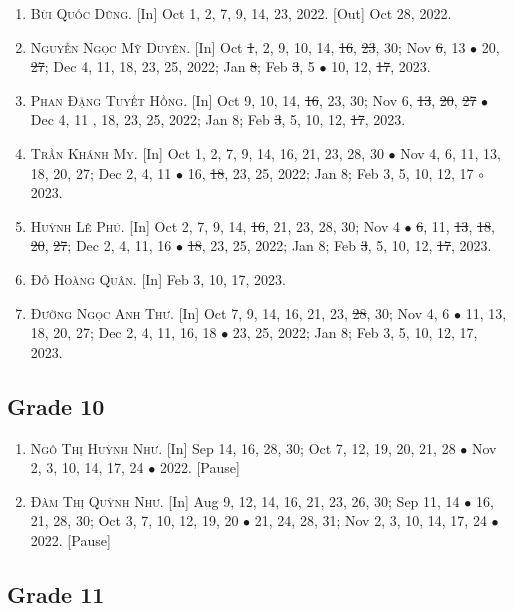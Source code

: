 \documentclass{article}
\numberwithin{equation}{section}
\begin{document}
\begin{enumerate}
	\item \textsc{Bùi Quốc Dũng.} \textsf{[In]} Oct 1, 2, 7, 9, 14, 23, 2022. \textsf{[Out]} Oct 28, 2022.
	\item \textsc{Nguyễn Ngọc Mỹ Duyên.} \textsf{[In]} Oct \st{1}, 2, 9, 10, 14, \st{16}, \st{23}, 30; Nov \st{6}, 13 $\bullet$ 20, \st{27}; Dec 4, 11, 18, 23, 25, 2022; Jan \st{8}; Feb \st{3}, 5 $\bullet$ 10, 12, \st{17}, 2023.
	\item \textsc{Phan Đặng Tuyết Hồng.} \textsf{[In]} Oct 9, 10, 14, \st{16}, 23, 30; Nov 6, \st{13}, \st{20}, \st{27} $\bullet$ Dec 4, 11 , 18, 23, 25, 2022; Jan 8; Feb \st{3}, 5, 10, 12, \st{17}, 2023.
	\item \textsc{Trần Khánh My.} \textsf{[In]} Oct 1, 2, 7, 9, 14, 16, 21, 23, 28, 30 $\bullet$ Nov 4, 6, 11, 13, 18, 20, 27; Dec 2, 4, 11 $\bullet$ 16, \st{18}, 23, 25, 2022; Jan 8; Feb 3, 5, 10, 12, 17 $\circ$ 2023.
	\item \textsc{Huỳnh Lê Phú.} \textsf{[In]} Oct 2, 7, 9, 14, \st{16}, 21, 23, 28, 30; Nov 4 $\bullet$ \st{6}, 11, \st{13}, \st{18}, \st{20}, \st{27}; Dec 2, 4, 11, 16 $\bullet$ \st{18}, 23, 25, 2022; Jan 8; Feb \st{3}, 5, 10, 12, \st{17}, 2023.
	\item \textsc{Đỗ Hoàng Quân.} \textsf{[In]} Feb 3, 10, 17, 2023.
	\item \textsc{Đường Ngọc Anh Thư.} \textsf{[In]} Oct 7, 9, 14, 16, 21, 23, \st{28}, 30; Nov 4, 6 $\bullet$ 11, 13, 18, 20, 27; Dec 2, 4, 11, 16, 18 $\bullet$ 23, 25, 2022; Jan 8; Feb 3, 5, 10, 12, 17, 2023.
\end{enumerate}

\subsection{Grade 10}

\begin{enumerate}
	\item \textsc{Ngô Thị Huỳnh Như.} \textsf{[In]} Sep 14, 16, 28, 30; Oct 7, 12, 19, 20, 21, 28 $\bullet$ Nov 2, 3, 10, 14, 17, 24 $\bullet$ 2022. \textsf{[Pause]}
	\item \textsc{Đàm Thị Quỳnh Như.} \textsf{[In]} Aug 9, 12, 14, 16, 21, 23, 26, 30; Sep 11, 14 $\bullet$ 16, 21, 28, 30; Oct 3, 7, 10, 12, 19, 20 $\bullet$ 21, 24, 28, 31; Nov 2, 3, 10, 14, 17, 24 $\bullet$ 2022. \textsf{[Pause]}
\end{enumerate}

\subsection{Grade 11}
\end{document}

